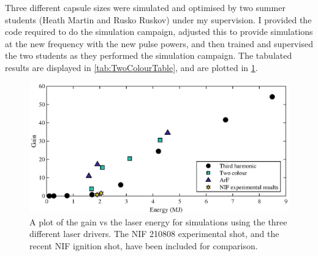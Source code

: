 Three different capsule sizes were simulated and optimised by two summer students (Heath Martin and Rusko Ruskov) under my supervision. I provided the code required to do the simulation campaign, adjusted this to provide simulations at the new frequency with the new pulse powers, and then trained and supervised the two students as they performed the simulation campaign. The tabulated results are displayed in \ref{tab:TwoColourTable}, and are plotted in \ref{fig:ArF and Two colour}.

\begin{figure}[ht]
\centering
\includegraphics{figures/FurtherSims/ArFandTwoColour.eps}
\caption{A plot of the gain vs the laser energy for simulations using the three different laser drivers. The NIF 210808 experimental shot, and the recent NIF ignition shot, have been included for comparison.}
\label{fig:ArF and Two colour}
\end{figure}


